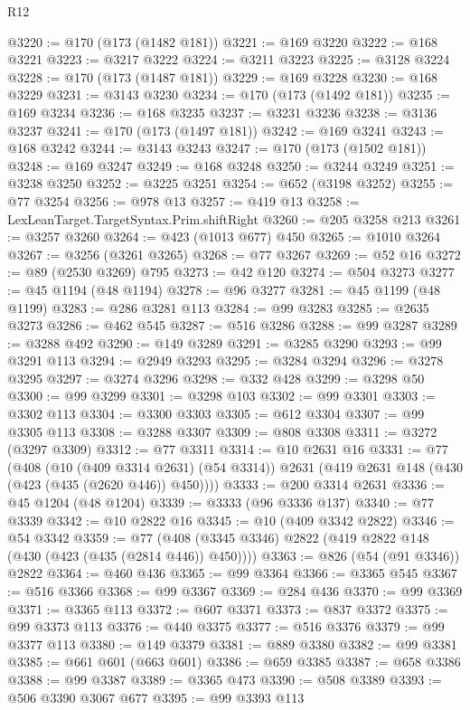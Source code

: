 \begin{lexlean}{R12}
\begin{coremodule}
@3220 := @170 (@173 (@1482 @181))
@3221 := @169 @3220
@3222 := @168 @3221
@3223 := @3217 @3222
@3224 := @3211 @3223
@3225 := @3128 @3224
@3228 := @170 (@173 (@1487 @181))
@3229 := @169 @3228
@3230 := @168 @3229
@3231 := @3143 @3230
@3234 := @170 (@173 (@1492 @181))
@3235 := @169 @3234
@3236 := @168 @3235
@3237 := @3231 @3236
@3238 := @3136 @3237
@3241 := @170 (@173 (@1497 @181))
@3242 := @169 @3241
@3243 := @168 @3242
@3244 := @3143 @3243
@3247 := @170 (@173 (@1502 @181))
@3248 := @169 @3247
@3249 := @168 @3248
@3250 := @3244 @3249
@3251 := @3238 @3250
@3252 := @3225 @3251
@3254 := @652 (@3198 @3252)
@3255 := @77 @3254
@3256 := @978 @13
@3257 := @419 @13
@3258 := LexLeanTarget.TargetSyntax.Prim.shiftRight
@3260 := @205 @3258 @213
@3261 := @3257 @3260
@3264 := @423 (@1013 @677) @450
@3265 := @1010 @3264
@3267 := @3256 (@3261 @3265)
@3268 := @77 @3267
@3269 := @52 @16
@3272 := @89 (@2530 @3269) @795
@3273 := @42 @120
@3274 := @504 @3273
@3277 := @45 @1194 (@48 @1194)
@3278 := @96 @3277
@3281 := @45 @1199 (@48 @1199)
@3283 := @286 @3281 @113
@3284 := @99 @3283
@3285 := @2635 @3273
@3286 := @462 @545
@3287 := @516 @3286
@3288 := @99 @3287
@3289 := @3288 @492
@3290 := @149 @3289
@3291 := @3285 @3290
@3293 := @99 @3291 @113
@3294 := @2949 @3293
@3295 := @3284 @3294
@3296 := @3278 @3295
@3297 := @3274 @3296
@3298 := @332 @428
@3299 := @3298 @50
@3300 := @99 @3299
@3301 := @3298 @103
@3302 := @99 @3301
@3303 := @3302 @113
@3304 := @3300 @3303
@3305 := @612 @3304
@3307 := @99 @3305 @113
@3308 := @3288 @3307
@3309 := @808 @3308
@3311 := @3272 (@3297 @3309)
@3312 := @77 @3311
@3314 := @10 @2631 @16
@3331 := @77
    (@408
      (@10 (@409 @3314 @2631) (@54 @3314))
      @2631
      (@419 @2631 @148 (@430 (@423 (@435 (@2620 @446)) @450))))
@3333 := @200 @3314 @2631
@3336 := @45 @1204 (@48 @1204)
@3339 := @3333 (@96 @3336 @137)
@3340 := @77 @3339
@3342 := @10 @2822 @16
@3345 := @10 (@409 @3342 @2822)
@3346 := @54 @3342
@3359 := @77 (@408 (@3345 @3346) @2822 (@419 @2822 @148 (@430 (@423 (@435 (@2814 @446)) @450))))
@3363 := @826 (@54 (@91 @3346)) @2822
@3364 := @460 @436
@3365 := @99 @3364
@3366 := @3365 @545
@3367 := @516 @3366
@3368 := @99 @3367
@3369 := @284 @436
@3370 := @99 @3369
@3371 := @3365 @113
@3372 := @607 @3371
@3373 := @837 @3372
@3375 := @99 @3373 @113
@3376 := @440 @3375
@3377 := @516 @3376
@3379 := @99 @3377 @113
@3380 := @149 @3379
@3381 := @889 @3380
@3382 := @99 @3381
@3385 := @661 @601 (@663 @601)
@3386 := @659 @3385
@3387 := @658 @3386
@3388 := @99 @3387
@3389 := @3365 @473
@3390 := @508 @3389
@3393 := @506 @3390 @3067 @677
@3395 := @99 @3393 @113

\end{coremodule}
\end{lexlean}
